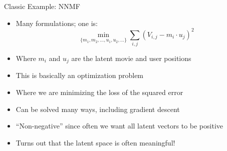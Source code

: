 \documentclass[aspectratio=169]{beamer}
\begin{document}
\begin{frame}{Classic Example: NNMF}

\begin{itemize}
\item Many formulations; one is:
	$$ \min_{\{m_1, m_2, ..., u_1, u_2, ...\}} \sum_{i, j} (V_{i,j} - m_i \cdot u_j)^2$$
\end{itemize}
	\begin{itemize}
	\item Where $m_i$  and $u_j$ are the latent movie and user positions
	\item This is basically an optimization problem
	\item Where we are minimizing the loss of the squared error
	\item Can be solved many ways, including gradient descent %
	\item ``Non-negative'' since often we want all latent vectors to be positive
	\item Turns out that the latent space is often meaningful!
	\end{itemize}
\end{frame}
\end{document}
